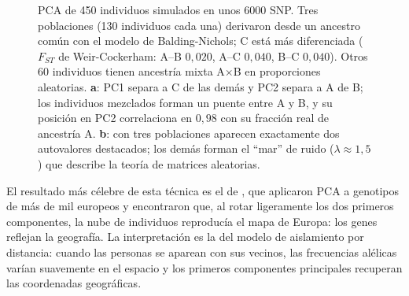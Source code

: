 \begin{figure}[t]
\centering
{}
\caption[PCA de tres poblaciones]{PCA de 450 individuos simulados en unos \num{6000} SNP. Tres poblaciones (130 individuos cada una) derivaron desde un ancestro común con el modelo de Balding-Nichols; C está más diferenciada ($F_{ST}$ de Weir-Cockerham: A--B $0{,}020$, A--C $0{,}040$, B--C $0{,}040$). Otros 60 individuos tienen ancestría mixta A$\times$B en proporciones aleatorias. \textbf{a}: PC1 separa a C de las demás y PC2 separa a A de B; los individuos mezclados forman un puente entre A y B, y su posición en PC2 correlaciona en $0{,}98$ con su fracción real de ancestría A. \textbf{b}: con tres poblaciones aparecen exactamente dos autovalores destacados; los demás forman el ``mar'' de ruido ($\lambda\approx1{,}5$) que describe la teoría de matrices aleatorias.}
\label{fig:10-pca}
\end{figure}

El resultado más célebre de esta técnica es el de \textcite{c10-novembre2008}, que aplicaron PCA a genotipos de más de mil europeos y encontraron que, al rotar ligeramente los dos primeros componentes, la nube de individuos reproducía el mapa de Europa: los genes reflejan la geografía. La interpretación es la del modelo de aislamiento por distancia: cuando las personas se aparean con sus vecinos, las frecuencias alélicas varían suavemente en el espacio y los primeros componentes principales recuperan las coordenadas geográficas.

